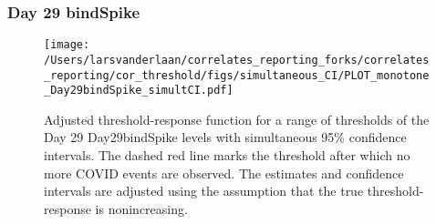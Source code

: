 \documentclass[]{article}
\begin{document}
\clearpage
\clearpage

\clearpage

\hypertarget{day-29-bindspike-3}{%
\subsubsection{Day 29 bindSpike}\label{day-29-bindspike-3}}

\begin{figure}[H]
\centering
\texttt{[image: /Users/larsvanderlaan/correlates\_reporting\_forks/correlates\_reporting/cor\_threshold/figs/simultaneous\_CI/PLOT\_monotone\_Day29bindSpike\_simultCI.pdf]}
\caption{Adjusted threshold-response function for a range of thresholds of the
  Day 29 Day29bindSpike levels with simultaneous 95\% confidence intervals. The dashed red line marks the threshold after which no more COVID events are observed. The estimates and confidence intervals are adjusted using the assumption that the true threshold-response is nonincreasing.}
\end{figure}
\end{document}
